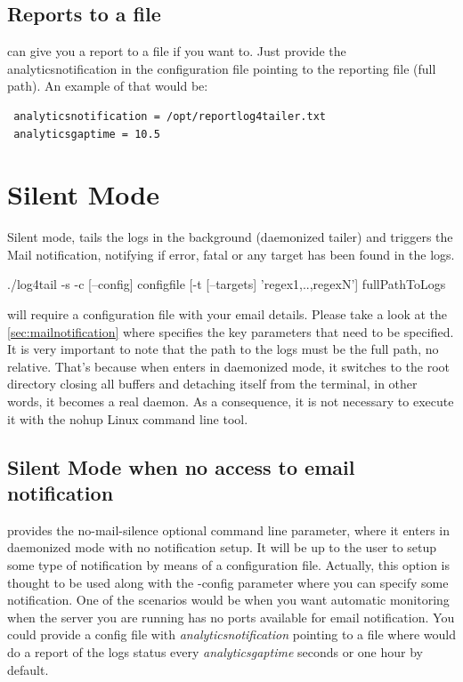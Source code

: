 \subsection{Reports to a file}
\logftailer{} can give you a report to a file if you want to. Just provide the
analyticsnotification in the configuration file pointing to the reporting file
(full path). An example of that would be:
\begin{verbatim}
 analyticsnotification = /opt/reportlog4tailer.txt
 analyticsgaptime = 10.5
\end{verbatim}

\section{Silent Mode}
Silent mode, tails the logs in the background (daemonized tailer) and triggers
the Mail notification, notifying if error, fatal or any target has been found in the logs. 
\begin{cmd}
 ./log4tail -s -c [--config] configfile [-t [--targets] 'regex1,..,regexN'] fullPathToLogs
\end{cmd}
\logftailer{} will require a configuration file with your email details. Please take a look 
at the \autoref{sec:mailnotification} where specifies the key parameters 
that need to be specified. It is very important to note that the path to the logs must be the 
full path, no relative. That's because when \logftailer{} enters in daemonized mode, it switches 
to the root directory closing all buffers and detaching itself from the terminal, in other words, 
it becomes a real daemon. As a consequence, it is not necessary to execute it with the nohup 
Linux command line tool.

\subsection{Silent Mode when no access to email notification}
\logftailer{} provides the no-mail-silence optional command line parameter, where it enters in 
daemonized mode with no notification setup. It will be up to the user to setup some type of 
notification by means of a configuration file. Actually, this option is thought to be used along 
with the -config parameter where you can specify some notification. One of the scenarios would be 
when you want automatic monitoring when the server you are running \logftailer{} has no ports available 
for email notification. You could provide a config file with \emph{analyticsnotification} pointing to 
a file where \logftailer{} would do a report of the logs status every \emph{analyticsgaptime} seconds 
or one hour by default.

